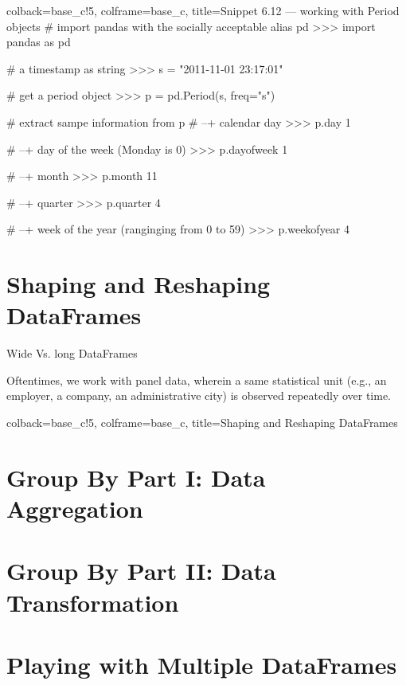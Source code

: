 \documentclass[a4paper,11pt]{book}
\numberwithin{figure}{chapter}
\numberwithin{table}{chapter}
\newcommand{\question}[1]{%
    \begin{tcolorbox}[colback=comp_c!10,colframe=comp_c,sidebyside align=top,width=\linewidth,before skip=1ex]
        #1
    \end{tcolorbox}
    \switchcolumn%
}
\newcommand{\note}[1]{%
    \begin{tcolorbox}[colback=white!0,colframe=white!10,width=\linewidth,before skip=1ex]
        #1
    \end{tcolorbox}
}
\begin{document}
\begin{pythoncode}[linenos=True]{colback=base_c!5, colframe=base_c, title=\sffamily Snippet 6.12 --- working with Period objects}
# import pandas with the socially acceptable alias pd
>>> import pandas as pd

# a timestamp as string 
>>> s = "2011-11-01 23:17:01"

# get a period object 
>>> p = pd.Period(s, freq="s")

# extract sampe information from p 
# --+ calendar day
>>> p.day
1

# --+ day of the week (Monday is 0)
>>> p.dayofweek
1 

# --+ month 
>>> p.month
11

# --+ quarter 
>>> p.quarter
4

# --+ week of the year (ranginging from 0 to 59)
>>> p.weekofyear
4

\end{pythoncode}
\clearpage

\section{Shaping and Reshaping DataFrames}

\begin{paracol}{2}
	\question{
		\raggedright Wide Vs. long DataFrames
		}
	\note{
		Oftentimes, we work with panel data, wherein a same statistical unit (e.g., an employer, a company, an administrative city) is observed repeatedly over time.
	}
\end{paracol}

\begin{pythoncode}[linenos=True]{colback=base_c!5, colframe=base_c, title=\sffamily Shaping and Reshaping DataFrames}

\end{pythoncode}

\section{Group By Part I: Data Aggregation}


\section{Group By Part II: Data Transformation}


\section{Playing with Multiple DataFrames}
\end{document}

